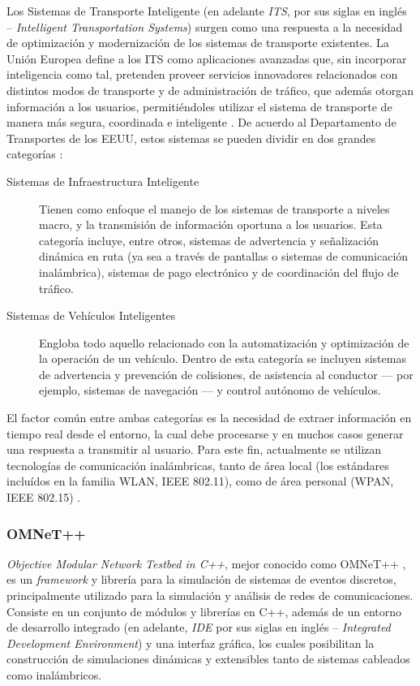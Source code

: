 \documentclass[11pt,letterpaper]{article}
\begin{document}
Los Sistemas de Transporte Inteligente (en adelante \emph{ITS}, por sus siglas en inglés -- \textit{Intelligent Transportation Systems}) surgen como una respuesta a la necesidad de optimización y modernización de los sistemas de transporte existentes. La Unión Europea define a los ITS como aplicaciones avanzadas que, sin incorporar inteligencia como tal, pretenden proveer servicios innovadores relacionados con distintos modos de transporte y de administración de tráfico, que además otorgan información a los usuarios, permitiéndoles utilizar el sistema de transporte de manera más segura, coordinada e inteligente \cite{eudirective}. De acuerdo al Departamento de Transportes de los EEUU, estos sistemas se pueden dividir en dos grandes categorías \cite{usdot}:
\begin{description}
  \item [Sistemas de Infraestructura Inteligente] Tienen como enfoque el manejo de los sistemas de transporte a niveles macro, y la transmisión de información oportuna a los usuarios. Esta categoría incluye, entre otros, sistemas de advertencia y señalización dinámica en ruta (ya sea a través de pantallas o sistemas de comunicación inalámbrica), sistemas de pago electrónico y de coordinación del flujo de tráfico.

  \item [Sistemas de Vehículos Inteligentes] Engloba todo aquello relacionado con la automatización y optimización de la operación de un vehículo. Dentro de esta categoría se incluyen sistemas de advertencia y prevención de colisiones, de asistencia al conductor --- por ejemplo, sistemas de navegación --- y control autónomo de vehículos.

\end{description}

El factor común entre ambas categorías es la necesidad de extraer información en tiempo real desde el entorno, la cual debe procesarse y en muchos casos generar una respuesta a transmitir al usuario. Para este fin, actualmente se utilizan tecnologías de comunicación inalámbricas, tanto de área local (los estándares incluídos en la familia WLAN, IEEE 802.11), como de área personal (WPAN, IEEE 802.15) \cite{80211dailey,80215vanet,80211wave}.

\subsubsection{OMNeT++}

\emph{Objective Modular Network Testbed in C++}, mejor conocido como OMNeT++ \cite{omnet}, es un \emph{framework} y librería para la simulación de sistemas de eventos discretos, principalmente utilizado para la simulación y análisis de redes de comunicaciones. Consiste en un conjunto de módulos y librerías en C++, además de un entorno de desarrollo integrado (en adelante, \emph{IDE} por sus siglas en inglés -- \emph{Integrated Development Environment}) y una interfaz gráfica, los cuales posibilitan la construcción de simulaciones dinámicas y extensibles tanto de sistemas cableados como inalámbricos.
\end{document}
